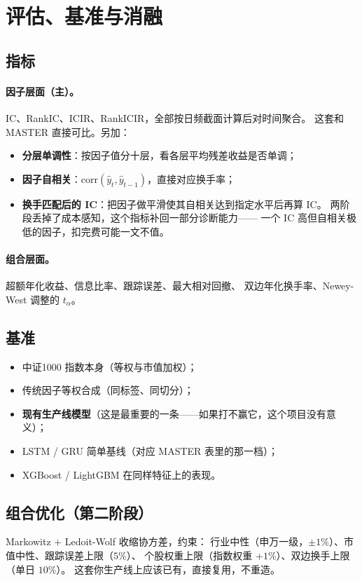 \documentclass[11pt, a4paper]{ctexart}
\begin{document}
\section{评估、基准与消融}
\label{sec:eval}

\subsection{指标}

\paragraph{因子层面（主）。}IC、RankIC、ICIR、RankICIR，全部按日频截面计算后对时间聚合。
这套和 MASTER 直接可比。另加：
\begin{itemize}
  \item \textbf{分层单调性}：按因子值分十层，看各层平均残差收益是否单调；
  \item \textbf{因子自相关}：$\text{corr}(\hat y_t, \hat y_{t-1})$，直接对应换手率；
  \item \textbf{换手匹配后的 IC}：把因子做平滑使其自相关达到指定水平后再算 IC。
        两阶段丢掉了成本感知，这个指标补回一部分诊断能力——
        一个 IC 高但自相关极低的因子，扣完费可能一文不值。
\end{itemize}

\paragraph{组合层面。}超额年化收益、信息比率、跟踪误差、最大相对回撤、
双边年化换手率、Newey-West 调整的 $t_\alpha$。

\subsection{基准}
\begin{itemize}
  \item 中证1000 指数本身（等权与市值加权）；
  \item 传统因子等权合成（同标签、同切分）；
  \item \textbf{现有生产线模型}（这是最重要的一条——如果打不赢它，这个项目没有意义）；
  \item LSTM / GRU 简单基线（对应 MASTER 表里的那一档）；
  \item XGBoost / LightGBM 在同样特征上的表现。
\end{itemize}

\subsection{组合优化（第二阶段）}
Markowitz $+$ Ledoit-Wolf 收缩协方差，约束：
行业中性（申万一级，$\pm 1\%$）、市值中性、跟踪误差上限（$5\%$）、
个股权重上限（指数权重 $+1\%$）、双边换手上限（单日 $10\%$）。
这套你生产线上应该已有，直接复用，不重造。
\end{document}
